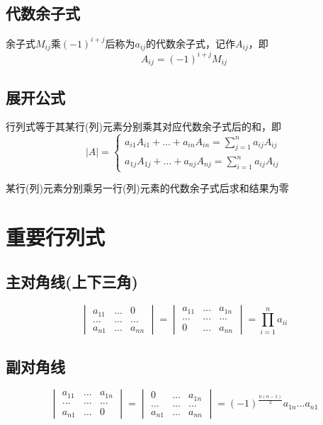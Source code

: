 \subsection{代数余子式}

余子式\(M_{ij}\)乘\((-1)^{i + j}\)后称为\(a_{ij}\)的代数余子式，记作\(A_{ij}\)，即\[A_{ij} = (-1)^{i+j}M_{ij}\]


\subsection{展开公式}

行列式等于其某行(列)元素分别乘其对应代数余子式后的和，即
\[|A| = 
\begin{cases}
a_{i1}A_{i1} +...+ a_{in}A_{in} = \displaystyle \sum_{j=1}^{n} a_{ij}A_{ij} \\ 
a_{1j}A_{1j} +...+ a_{nj}A_{nj} = \displaystyle \sum_{i=1}^{n} a_{ij}A_{ij}
\end{cases}
\]

某行(列)元素分别乘另一行(列)元素的代数余子式后求和结果为零


\section{重要行列式}

\subsection{主对角线(上下三角)}

\[
\begin{vmatrix}
a_{11} & ... & 0 \\
... & ... & ... \\
a_{n1} & ... & a_{nn}
\end{vmatrix} = 
\begin{vmatrix}
a_{11} & ... & a_{1n} \\
... & ... & ... \\
0 & ... & a_{nn}
\end{vmatrix} = \prod_{i = 1}^{n}a_{ii}
\]


\subsection{副对角线}

\[
\begin{vmatrix}
a_{11} & ... & a_{1n} \\
... & ... & ... \\
a_{n1} & ... & 0
\end{vmatrix} = 
\begin{vmatrix}
0 & ... & a_{1n} \\
... & ... & ... \\
a_{n1} & ... & a_{nn}
\end{vmatrix} = (-1)^{\frac{n(n - 1)}{2}}a_{1n}...a_{n1}
\]


